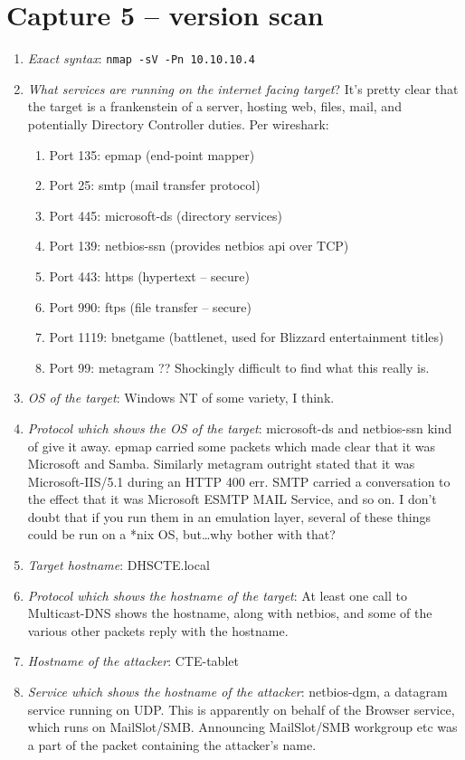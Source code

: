 \documentclass{article}
\begin{document}
\section{Capture 5 -- version scan}
\begin{enumerate}
	\item {\em Exact syntax}: \verb|nmap -sV -Pn 10.10.10.4|
	\item {\em What services are running on the internet facing target}?
		It's pretty clear that the target is a frankenstein of a
		server, hosting web, files, mail, and potentially Directory
		Controller duties. Per wireshark:
		\begin{enumerate}
			\item Port 135: epmap (end-point mapper)
			\item Port 25: smtp (mail transfer protocol)
			\item Port 445: microsoft-ds (directory services)
			\item Port 139: netbios-ssn (provides netbios api over
				TCP)
			\item Port 443: https (hypertext -- secure)
			\item Port 990: ftps (file transfer -- secure)
			\item Port 1119: bnetgame (battlenet, used for Blizzard entertainment titles)
			\item Port 99: metagram ?? Shockingly difficult to find what this really is.
		\end{enumerate}
	\item {\em OS of the target}: Windows NT of some variety, I think.
	\item {\em Protocol which shows the OS of the target}: microsoft-ds and
		netbios-ssn kind of give it away. epmap carried some packets
		which made clear that it was Microsoft and Samba. Similarly
		metagram outright stated that it was Microsoft-IIS/5.1 during
		an HTTP 400 err. SMTP carried a conversation to the effect that
		it was Microsoft ESMTP MAIL Service, and so on. I don't doubt
		that if you run them in an emulation layer, several of these
		things could be run on a *nix OS, but\dots why bother with
		that?
	\item {\em Target hostname}: DHSCTE.local
	\item {\em Protocol which shows the hostname of the target}: At least
		one call to Multicast-DNS shows the hostname, along with
		netbios, and some of the various other packets reply with the
		hostname.
	\item {\em Hostname of the attacker}: CTE-tablet
	\item {\em Service which shows the hostname of the attacker}:
		netbios-dgm, a datagram service running on UDP. This is
		apparently on behalf of the Browser service, which runs on
		MailSlot/SMB. Announcing MailSlot/SMB workgroup etc was a part
		of the packet containing the attacker's name.
\end{enumerate}
\end{document}
